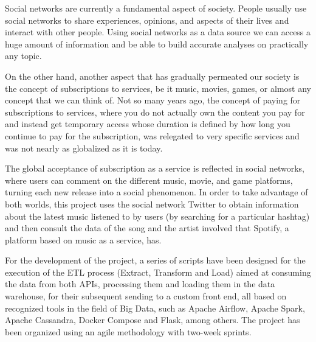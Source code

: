 

\nonzeroparskip Social networks are currently a fundamental aspect of society. People usually use social networks to share experiences, opinions, and aspects of their lives and interact with other people. Using social networks as a data source we can access a huge amount of information and be able to build accurate analyses on practically any topic.

\nonzeroparskip On the other hand, another aspect that has gradually permeated our society is the concept of subscriptions to services, be it music, movies, games, or almost any concept that we can think of. Not so many years ago, the concept of paying for subscriptions to services, where you do not actually own the content you pay for and instead get temporary access whose duration is defined by how long you continue to pay for the subscription, was relegated to very specific services and was not nearly as globalized as it is today.

\nonzeroparskip The global acceptance of subscription as a service is reflected in social networks, where users can comment on the different music, movie, and game platforms, turning each new release into a social phenomenon. In order to take advantage of both worlds, this project uses the social network Twitter to obtain information about the latest music listened to by users (by searching for a particular hashtag) and then consult the data of the song and the artist involved that Spotify, a platform based on music as a service, has.

\nonzeroparskip For the development of the project, a series of scripts have been designed for the execution of the ETL process (Extract, Transform and Load) aimed at consuming the data from both APIs, processing them and loading them in the data warehouse, for their subsequent sending to a custom front end, all based on recognized tools in the field of Big Data, such as Apache Airflow, Apache Spark, Apache Cassandra, Docker Compose and Flask, among others. The project has been organized using an agile methodology with two-week sprints.